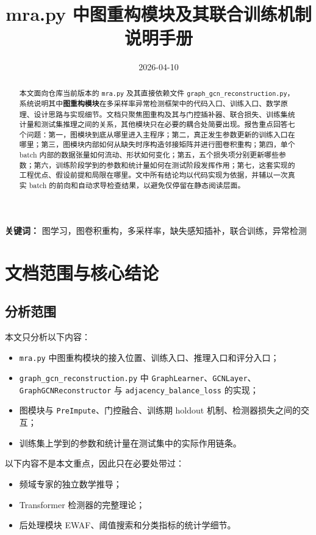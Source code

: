 \documentclass[UTF8]{ctexart}
\title{mra.py 中图重构模块及其联合训练机制说明手册}
\author{}
\date{2026-04-10}
\begin{document}
\maketitle

\begin{abstract}
本文面向仓库当前版本的 \verb|mra.py| 及其直接依赖文件 \verb|graph_gcn_reconstruction.py|，系统说明其中\textbf{图重构模块}在多采样率异常检测框架中的代码入口、训练入口、数学原理、设计思路与实现细节。文档只聚焦图重构及其与门控插补器、联合损失、训练集统计量和测试集推理之间的关系，其他模块只在必要的耦合处简要出现。报告重点回答七个问题：第一，图模块到底从哪里进入主程序；第二，真正发生参数更新的训练入口在哪里；第三，图模块内部如何从缺失时序构造邻接矩阵并进行图卷积重构；第四，单个 batch 内部的数据张量如何流动、形状如何变化；第五，五个损失项分别更新哪些参数；第六，训练阶段学到的参数和统计量如何在测试阶段发挥作用；第七，这套实现的工程优点、假设前提和局限在哪里。文中所有结论均以代码实现为依据，并辅以一次真实 batch 的前向和自动求导检查结果，以避免仅停留在静态阅读层面。
\end{abstract}

\noindent\textbf{关键词：} 图学习，图卷积重构，多采样率，缺失感知插补，联合训练，异常检测

\tableofcontents
\newpage

\section{文档范围与核心结论}

\subsection{分析范围}

本文只分析以下内容：
\begin{itemize}
    \item \verb|mra.py| 中图重构模块的接入位置、训练入口、推理入口和评分入口；
    \item \verb|graph_gcn_reconstruction.py| 中 \verb|GraphLearner|、\verb|GCNLayer|、\verb|GraphGCNReconstructor| 与 \verb|adjacency_balance_loss| 的实现；
    \item 图模块与 \verb|PreImpute|、门控融合、训练期 holdout 机制、检测器损失之间的交互；
    \item 训练集上学到的参数和统计量在测试集中的实际作用链条。
\end{itemize}

以下内容不是本文重点，因此只在必要处带过：
\begin{itemize}
    \item 频域专家的独立数学推导；
    \item Transformer 检测器的完整理论；
    \item 后处理模块 EWAF、阈值搜索和分类指标的统计学细节。
\end{itemize}
\end{document}
